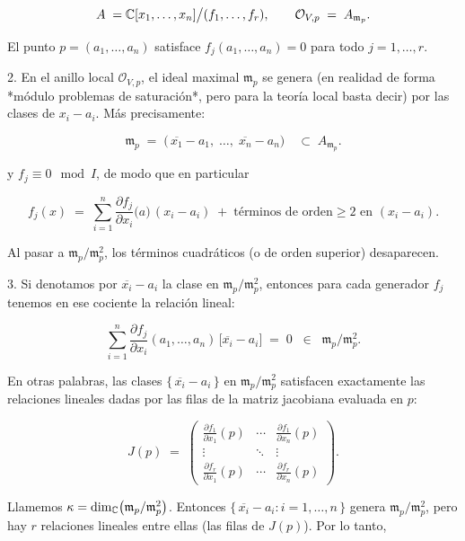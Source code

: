    $$
     A \;=\mathbb{C}[x_1,\dots,x_n] \big/ (f_1,\dots,f_r),
     \qquad
     \mathcal O_{V,p} \;=\; A_{\mathfrak m_p}.
   $$

   El punto $p=(a_1,\dots,a_n)$ satisface $f_j(a_1,\dots,a_n)=0$ para todo $j=1,\dots,r$.

2. En el anillo local $\mathcal O_{V,p}$, el ideal maximal $\mathfrak m_p$ se genera (en realidad de forma *módulo problemas de saturación*, pero para la teoría local basta decir) por las clases de $x_i - a_i$.  Más precisamente:

   $$
     \mathfrak m_p \;=\; \bigl(\,\overline{x_1}-a_1,\;\dots,\;\overline{x_n}-a_n\bigr)
     \quad\subset\; A_{\mathfrak m_p}.
   $$

   y $f_j \equiv 0 \mod I$, de modo que en particular

   $$
     f_j(x) \;=\; \sum_{i=1}^n \frac{\partial f_j}{\partial x_i}\bigl(a\bigr)\,(x_i - a_i)
     \;+\;\text{términos de orden}\geq 2\text{ en }(x_i - a_i).
   $$

   Al pasar a $\mathfrak m_p / \mathfrak m_p^2$, los términos cuadráticos (o de orden superior) desaparecen.

3. Si denotamos por $\overline{x_i}-a_i$ la clase en $\mathfrak m_p / \mathfrak m_p^2$, entonces para cada generador $f_j$ tenemos en ese cociente la relación lineal:

   $$
     \sum_{i=1}^n 
     \frac{\partial f_j}{\partial x_i}(a_1,\dots,a_n)
     \,\bigl[\overline{x_i}-a_i\bigr]
     \;=\; 0
     \;\;\in\;\;
     \mathfrak m_p / \mathfrak m_p^2.
   $$

   En otras palabras, las clases $\{\,\overline{x_i}-a_i\,\}$ en $\mathfrak m_p / \mathfrak m_p^2$ satisfacen exactamente las relaciones lineales dadas por las filas de la matriz jacobiana evaluada en $p$:

   $$
     J(p) \;=\; 
     \begin{pmatrix}
       \frac{\partial f_1}{\partial x_1}(p) & \cdots & \frac{\partial f_1}{\partial x_n}(p) \\
       \vdots & \ddots & \vdots \\
       \frac{\partial f_r}{\partial x_1}(p) & \cdots & \frac{\partial f_r}{\partial x_n}(p)
     \end{pmatrix}.
   $$

   Llamemos $\kappa = \dim_{\mathbb{C}}\bigl(\mathfrak m_p / \mathfrak m_p^2\bigr)$. Entonces $\{\,\overline{x_i}-a_i : i=1,\dots,n\,\}$ genera $\mathfrak m_p / \mathfrak m_p^2$, pero hay $r$ relaciones lineales entre ellas (las filas de $J(p)$). Por lo tanto,

